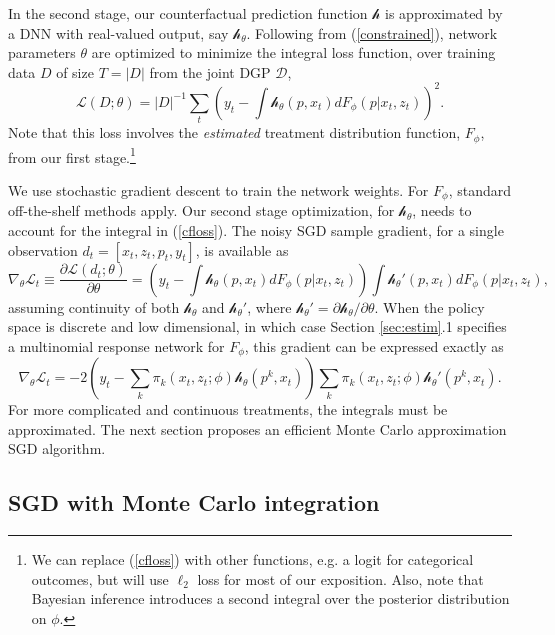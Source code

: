 \documentclass[12pt]{article}
\newcommand{\mc}[1]{\mathcal{#1}}
\newcommand{\outcome}{\ensuremath{y}}
\newcommand{\cf}{\ensuremath{\mathscr{h}}}
\newcommand{\price}{\ensuremath{p}}
\begin{document}
In the second stage, our counterfactual prediction function $\cf$ is approximated by a DNN with real-valued output, say $\cf_\theta$.
Following from (\ref{constrained}), network parameters $\theta$ are optimized to minimize the integral loss function, over training data $D$ of size $T = |D|$ from the joint DGP $\mc{D}$,
\begin{equation}
\label{cfloss} 
\mathcal{L}(D; \theta) =  |D|^{-1}\sum_t\left(y_t - \int \cf_\theta(\price,x_t) dF_\phi(\price|x_t,z_t)\right)^2.
\end{equation}
Note that this loss involves the {\it estimated} treatment distribution function, $F_\phi$, from our first stage.\footnote{
We can replace (\ref{cfloss}) with other functions, e.g. a logit for categorical outcomes, but will use $\ell_2$ loss for most of our exposition.  Also, note that Bayesian inference introduces a second integral over the posterior distribution on $\phi$.}  

We use stochastic gradient descent \citep[SGD; see specific algorithms in, e.g.,][]{duchi2011adaptive,kingma2015adam} to train the network weights.  For $F_\phi$, standard off-the-shelf methods apply.  Our second stage optimization, for $\cf_\theta$, needs to account for the integral in (\ref{cfloss}).  The noisy SGD sample gradient, for a single observation $d_t = [x_t,z_t,\price_t,\outcome_t]$,  is avai{}lable as
\begin{equation}
\label{genericgrad}
\nabla_\theta \mathcal{L}_t \equiv \frac{\partial\mathcal{L}(d_t; \theta)}{\partial \theta} = 
 \left(y_t - \int \cf_\theta(\price,x_t) dF_\phi(\price|x_t,z_t)\right) 
 \int \cf_\theta'(\price,x_t)dF_\phi(\price|x_t,z_t),
\end{equation}
assuming continuity of both $\cf_\theta$ and $\cf_\theta'$,  where
$\cf_\theta' = \partial\cf_\theta/\partial\theta$. When the policy space is discrete and low dimensional, in which case Section \ref{sec:estim}.1 specifies a multinomial response network for $F_\phi$, this gradient can be expressed exactly as
\begin{equation}
\label{discretegrad}
\nabla_\theta \mathcal{L}_t = 
 -2\left(y_t - \sum_k \pi_k(x_t,z_t;\phi) \cf_\theta(\price^k,x_t) \right) 
 \sum_k \pi_k(x_t,z_t;\phi)\cf_\theta'(\price^k,x_t).
\end{equation}
For more complicated and continuous treatments, the integrals must be approximated.  The next section proposes an efficient Monte Carlo approximation SGD algorithm.


\subsection{SGD with Monte Carlo integration}
\end{document}

